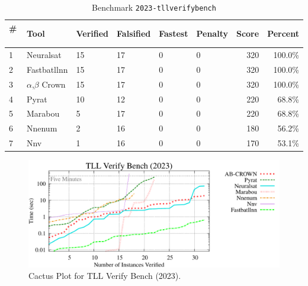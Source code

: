
\begin{table}[h]
\begin{center}
\caption{Benchmark \texttt{2023-tllverifybench}} \label{tab:cat_{cat}}
{\setlength{\tabcolsep}{2pt}
\begin{tabular}[h]{@{}llllllrr@{}}
\toprule
\textbf{\# ~} & \textbf{Tool} & \textbf{Verified} & \textbf{Falsified} & \textbf{Fastest} & \textbf{Penalty} & \textbf{Score} & \textbf{Percent}\\
\midrule
1 & Neuralsat & 15 & 17 & 0 & 0 & 320 & 100.0\% \\
2 & Fastbatllnn & 15 & 17 & 0 & 0 & 320 & 100.0\% \\
3 & $\alpha$,$\beta$ Crown & 15 & 17 & 0 & 0 & 320 & 100.0\% \\
4 & Pyrat & 10 & 12 & 0 & 0 & 220 & 68.8\% \\
5 & Marabou & 5 & 17 & 0 & 0 & 220 & 68.8\% \\
6 & Nnenum & 2 & 16 & 0 & 0 & 180 & 56.2\% \\
7 & Nnv & 1 & 16 & 0 & 0 & 170 & 53.1\% \\
\bottomrule
\end{tabular}
}
\end{center}
\end{table}



\begin{figure}[h]
\centerline{\includegraphics[width=\textwidth]{cactus/2023_tllverifybench.pdf}}
\caption{Cactus Plot for TLL Verify Bench (2023).}
\label{fig:quantPic}
\end{figure}



